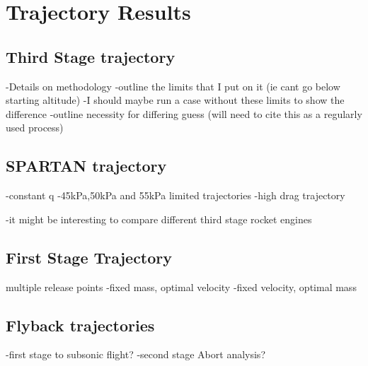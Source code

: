 
\cleardoublepage
\chapter{Trajectory Results}\label{chapter:numerical}




\section{Third Stage trajectory}
-Details on methodology
-outline the limits that I put on it (ie cant go below starting altitude)
-I should maybe run a case without these limits to show the difference
-outline necessity for differing guess (will need to cite this as a regularly used process)

\section{SPARTAN trajectory}
-constant q
-45kPa,50kPa and 55kPa limited trajectories
-high drag trajectory

-it might be interesting to compare different third stage rocket engines 

\section{First Stage Trajectory}
multiple release points
-fixed mass, optimal velocity
-fixed velocity, optimal mass

\section{Flyback trajectories }

-first stage to subsonic flight? 
-second stage
Abort analysis?
